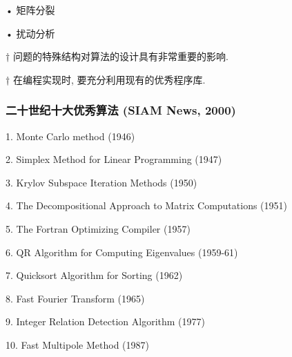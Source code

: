 \documentclass[12pt,a4paper]{article}
\begin{document}
	• 矩阵分裂
	
	• 扰动分析

\begin{framed}
	† 问题的特殊结构对算法的设计具有非常重要的影响.
\end{framed}

\begin{framed}
	† 在编程实现时, 要充分利用现有的优秀程序库.
\end{framed}

\subsubsection*{二十世纪十大优秀算法 (SIAM News, 2000)}
1. Monte Carlo method (1946)

2. Simplex Method for Linear Programming (1947)

3. Krylov Subspace Iteration Methods (1950)

4. The Decompositional Approach to Matrix Computations (1951)

5. The Fortran Optimizing Compiler (1957)

6. QR Algorithm for Computing Eigenvalues (1959-61)

7. Quicksort Algorithm for Sorting (1962)

8. Fast Fourier Transform (1965)

9. Integer Relation Detection Algorithm (1977)

10. Fast Multipole Method (1987)
\end{document}

